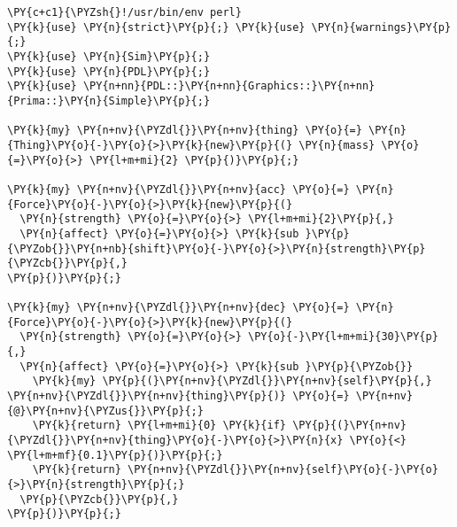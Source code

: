 \begin{Verbatim}[commandchars=\\\{\}]
\PY{c+c1}{\PYZsh{}!/usr/bin/env perl}
\PY{k}{use} \PY{n}{strict}\PY{p}{;} \PY{k}{use} \PY{n}{warnings}\PY{p}{;}
\PY{k}{use} \PY{n}{Sim}\PY{p}{;}
\PY{k}{use} \PY{n}{PDL}\PY{p}{;}
\PY{k}{use} \PY{n+nn}{PDL::}\PY{n+nn}{Graphics::}\PY{n+nn}{Prima::}\PY{n}{Simple}\PY{p}{;}

\PY{k}{my} \PY{n+nv}{\PYZdl{}}\PY{n+nv}{thing} \PY{o}{=} \PY{n}{Thing}\PY{o}{-}\PY{o}{>}\PY{k}{new}\PY{p}{(} \PY{n}{mass} \PY{o}{=}\PY{o}{>} \PY{l+m+mi}{2} \PY{p}{)}\PY{p}{;}

\PY{k}{my} \PY{n+nv}{\PYZdl{}}\PY{n+nv}{acc} \PY{o}{=} \PY{n}{Force}\PY{o}{-}\PY{o}{>}\PY{k}{new}\PY{p}{(}
  \PY{n}{strength} \PY{o}{=}\PY{o}{>} \PY{l+m+mi}{2}\PY{p}{,}
  \PY{n}{affect} \PY{o}{=}\PY{o}{>} \PY{k}{sub }\PY{p}{\PYZob{}}\PY{n+nb}{shift}\PY{o}{-}\PY{o}{>}\PY{n}{strength}\PY{p}{\PYZcb{}}\PY{p}{,}
\PY{p}{)}\PY{p}{;}

\PY{k}{my} \PY{n+nv}{\PYZdl{}}\PY{n+nv}{dec} \PY{o}{=} \PY{n}{Force}\PY{o}{-}\PY{o}{>}\PY{k}{new}\PY{p}{(}
  \PY{n}{strength} \PY{o}{=}\PY{o}{>} \PY{o}{-}\PY{l+m+mi}{30}\PY{p}{,}
  \PY{n}{affect} \PY{o}{=}\PY{o}{>} \PY{k}{sub }\PY{p}{\PYZob{}}
    \PY{k}{my} \PY{p}{(}\PY{n+nv}{\PYZdl{}}\PY{n+nv}{self}\PY{p}{,} \PY{n+nv}{\PYZdl{}}\PY{n+nv}{thing}\PY{p}{)} \PY{o}{=} \PY{n+nv}{@}\PY{n+nv}{\PYZus{}}\PY{p}{;}
    \PY{k}{return} \PY{l+m+mi}{0} \PY{k}{if} \PY{p}{(}\PY{n+nv}{\PYZdl{}}\PY{n+nv}{thing}\PY{o}{-}\PY{o}{>}\PY{n}{x} \PY{o}{<} \PY{l+m+mf}{0.1}\PY{p}{)}\PY{p}{;}
    \PY{k}{return} \PY{n+nv}{\PYZdl{}}\PY{n+nv}{self}\PY{o}{-}\PY{o}{>}\PY{n}{strength}\PY{p}{;}
  \PY{p}{\PYZcb{}}\PY{p}{,}
\PY{p}{)}\PY{p}{;}
\end{Verbatim}
